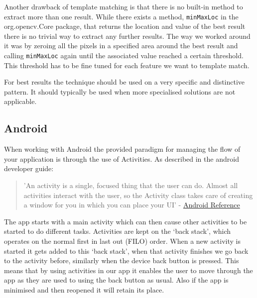 Another drawback of template matching is that there is no built-in method to extract more than one result. While there exists a method, \verb!minMaxLoc! in the org.opencv.Core package, that returns the location and value of the best result there is no trivial way to extract any further results. The way we worked around it was by zeroing all the pixels in a specified area around the best result and calling \verb!minMaxLoc! again until the associated value reached a certain threshold. This threshold has to be fine tuned for each feature we want to template match.

For best results the technique should be used on a very specific and distinctive pattern. It should typically be used when more specialised solutions are not applicable.

    \subsection{Android} \label{sec:android}
When working with Android the provided paradigm for managing the flow of your application is through the use of Activities. As described in the android developer guide:

\begin{quote} 'An activity is a single, focused thing that the user can do. Almost all activities interact with the user, so the Activity class takes care of creating a window for you in which you can place your UI' - \href{http://developer.android.com/reference/android/app/Activity.html}{Android Reference}
\end{quote}  

The app starts with a main activity which can then cause other activities to be started to do different tasks. Activities are kept on the ‘back stack’, which operates on the normal first in last out (FILO) order. When a new activity is started it gets added to this ‘back stack’, when that activity finishes we go back to the activity before, similarly when the device back button is pressed. This means that by using
activities in our app it enables the user to move through the app as they are used to using the back button as usual. Also if the app is minimised and then reopened it will retain its place.


